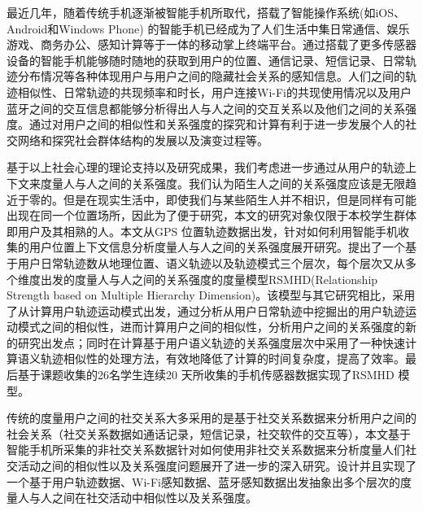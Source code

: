 \begin{cabstract}
最近几年，随着传统手机逐渐被智能手机所取代，搭载了智能操作系统(如iOS、Android和Windows Phone) 的智能手机已经成为了人们生活中集日常通信、娱乐游戏、商务办公、感知计算等于一体的移动掌上终端平台。通过搭载了更多传感器设备的智能手机能够随时随地的获取到用户的位置、通信记录、短信记录、日常轨迹分布情况等各种体现用户与用户之间的隐藏社会关系的感知信息。人们之间的轨迹相似性、日常轨迹的共现频率和时长，用户连接Wi-Fi的共现使用情况以及用户蓝牙之间的交互信息都能够分析得出人与人之间的交互关系以及他们之间的关系强度。通过对用户之间的相似性和关系强度的探究和计算有利于进一步发展个人的社交网络和探究社会群体结构的发展以及演变过程等。

基于以上社会心理的理论支持以及研究成果，我们考虑进一步通过从用户的轨迹上下文来度量人与人之间的关系强度。我们认为陌生人之间的关系强度应该是无限趋近于零的。但是在现实生活中，即使我们与某些陌生人并不相识，但是同样有可能出现在同一个位置场所，因此为了便于研究，本文的研究对象仅限于本校学生群体即用户及其相熟的人。本文从GPS 位置轨迹数据出发，针对如何利用智能手机收集的用户位置上下文信息分析度量人与人之间的关系强度展开研究。提出了一个基于用户日常轨迹数从地理位置、语义轨迹以及轨迹模式三个层次，每个层次又从多个维度出发的度量人与人之间的关系强度的度量模型RSMHD(Relationship Strength based on Multiple Hierarchy Dimension)。该模型与其它研究相比，采用了从计算用户轨迹运动模式出发，通过分析从用户日常轨迹中挖掘出的用户轨迹运动模式之间的相似性，进而计算用户之间的相似性，分析用户之间的关系强度的新的研究出发点；同时在计算基于用户语义轨迹的关系强度层次中采用了一种快速计算语义轨迹相似性的处理方法，有效地降低了计算的时间复杂度，提高了效率。最后基于课题收集的26名学生连续20 天所收集的手机传感器数据实现了RSMHD 模型。

传统的度量用户之间的社交关系大多采用的是基于社交关系数据来分析用户之间的社会关系（社交关系数据如通话记录，短信记录，社交软件的交互等），本文基于智能手机所采集的非社交关系数据针对如何使用非社交关系数据来分析度量人们社交活动之间的相似性以及关系强度问题展开了进一步的深入研究。设计并且实现了一个基于用户轨迹数据、Wi-Fi感知数据、蓝牙感知数据出发抽象出多个层次的度量人与人之间在社交活动中相似性以及关系强度。


\end{cabstract}
